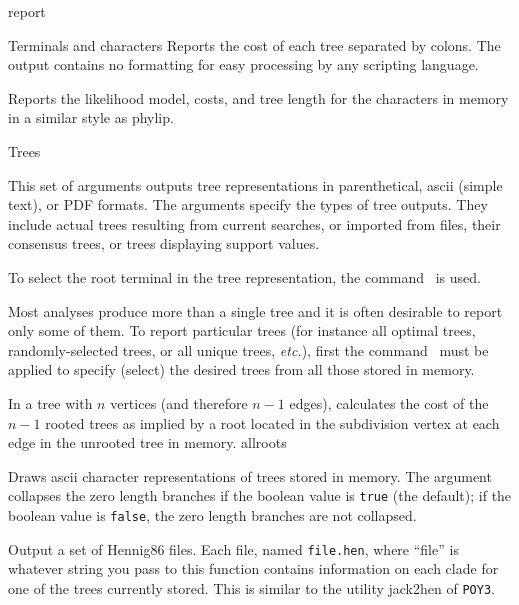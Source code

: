\begin{command}{report}{}
\begin{arguments}
\begin{argumentgroup}{Terminals and characters}
                {Reports the cost of each tree separated by colons. The output
                contains no formatting for easy processing by any scripting
                language.}
                {}

                {Reports the likelihood model, costs, and tree length for the
                characters in memory in a similar style as phylip.}
                {}

		\end{argumentgroup}

		\begin{argumentgroup}{Trees}
            {This set of arguments outputs tree representations
            in parenthetical, ascii (simple text), or PDF formats.
            The arguments specify the types of tree outputs. They include
            actual trees resulting from current searches, or imported from
            files, their consensus trees, or trees displaying support values.
            
            To select the root terminal in the tree representation, the command~ is used.
            
            Most analyses produce more than a single tree and it is
            often desirable to report only some of them. To
            report particular trees (for instance all optimal trees,
            randomly-selected trees, or all unique trees, \emph{etc.}), first the
            command~ must be applied to specify (select)
             the desired trees from all those stored in memory.} 

                {In a tree with $n$ vertices (and therefore $n - 1$ edges),
                calculates the cost of the $n - 1$ rooted trees as implied by a
                root located in the subdivision vertex at each edge in the unrooted
                tree in memory.}
                {allroots}

                {Draws ascii character representations of trees stored in memory. The
                argument  collapses the zero length branches if
                the boolean value is \texttt{true} (the default); if the boolean value is
                \texttt{false}, the zero length branches are not collapsed.}
				{}

	     {Output a set of Hennig86 files. Each file, named \texttt{file.hen},
                where ``file'' is whatever string you pass to this function
                contains information on each clade for one of the trees
                currently stored. This is similar to the utility jack2hen 
                of \texttt{POY3}.}
				{}


\end{argumentgroup}
\end{arguments}
\end{command}
